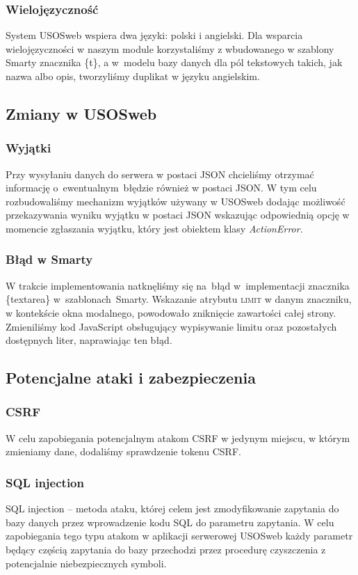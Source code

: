 \documentclass[licencjacka]{pracamgr}
\begin{document}
\subsubsection{Wielojęzyczność}
System USOSweb wspiera dwa języki: polski i angielski. Dla wsparcia wielojęzyczności w naszym module korzystaliśmy z wbudowanego w szablony Smarty znacznika \{t\}, a w~modelu bazy danych dla pól tekstowych takich, jak nazwa albo opis, tworzyliśmy duplikat w języku angielskim.
\subsection{Zmiany w USOSweb}
\subsubsection{Wyjątki}
Przy wysyłaniu danych do serwera w postaci JSON chcieliśmy otrzymać informację o~ewentualnym~błędzie również w postaci JSON. W tym celu rozbudowaliśmy mechanizm wyjątków używany w USOSweb dodając możliwość przekazywania wyniku wyjątku w postaci JSON wskazując odpowiednią opcję w momencie zgłaszania wyjątku, który jest obiektem klasy \textsl{ActionError}.
\subsubsection{Błąd w Smarty}
W trakcie implementowania natknęliśmy się na~błąd w~implementacji znacznika \{textarea\} w~szablonach~Smarty. Wskazanie atrybutu \textsc{limit} w danym znaczniku, w kontekście okna modalnego, powodowało zniknięcie zawartości całej strony. Zmieniliśmy kod JavaScript obsługujący wypisywanie limitu oraz pozostałych dostępnych liter, naprawiając ten błąd.
\subsection{Potencjalne ataki i zabezpieczenia} \label{subsec:bezpiecz}
\subsubsection{CSRF}
W celu zapobiegania potencjalnym atakom CSRF w jedynym miejscu, w którym zmieniamy dane, dodaliśmy sprawdzenie tokenu CSRF.
\subsubsection{SQL injection}
SQL injection -- metoda ataku, której celem jest zmodyfikowanie zapytania do bazy danych przez wprowadzenie kodu SQL do parametru zapytania. W celu 
zapobiegania tego typu atakom w aplikacji serwerowej USOSweb każdy parametr będący częścią zapytania do bazy przechodzi przez procedurę czyszczenia z 
potencjalnie niebezpiecznych symboli.
\end{document}
